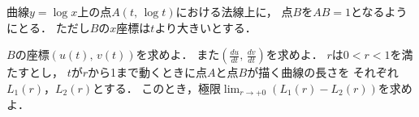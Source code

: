 \documentclass[../../main.tex]{subfiles}
\begin{document}
曲線$y=\log x$上の点$A(t, \, \log t)$における法線上に，
点$B$を$AB=1$となるようにとる．
ただし$B$の$x$座標は$t$より大きいとする．
\begin{enumerate}
  $B$の座標$(u(t), \, v(t))$を求めよ．
    また$\displaystyle \left( \frac{du}{dt}, \, \frac{dv}{dt} \right)$を求めよ．
  $r$は$0<r<1$を満たすとし，
    $t$が$r$から1まで動くときに点$A$と点$B$が描く曲線の長さを
    それぞれ$L_1(r)$，$L_2(r)$とする．
    このとき，極限$\displaystyle\lim_{r\to+0}(L_1(r)-L_2(r))$を求めよ．
\end{enumerate}
\end{document}
